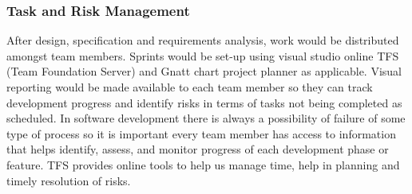 \documentclass{article}
\begin{document}
\subsubsection{Task and Risk Management}
After design, specification and requirements analysis, work would be distributed amongst team members. Sprints would be set-up using visual studio online TFS (Team Foundation Server) and Gnatt chart project planner as applicable. Visual reporting would be made available to each team member so they can track development progress and identify risks in terms of tasks not being completed as scheduled. In software development there is always a possibility of failure of some type of process so it is important every team member has access to information that helps identify, assess, and monitor progress of each development phase or feature. TFS provides online tools to help us manage time, help in planning and timely resolution of risks.

\newpage
\end{document}
